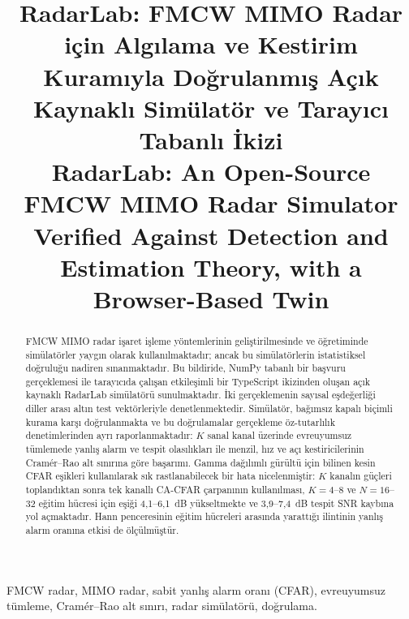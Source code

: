 \documentclass[conference,a4paper,10pt]{IEEEtran}
\begin{document}
\title{RadarLab: FMCW MIMO Radar için Algılama ve Kestirim Kuramıyla Doğrulanmış Açık Kaynaklı Simülatör ve Tarayıcı Tabanlı İkizi\\[0.6ex]
{\fontsize{13}{15.5}\selectfont RadarLab: An Open-Source FMCW MIMO Radar Simulator Verified Against Detection and Estimation Theory, with a Browser-Based Twin}}

\author{}

\maketitle

\renewcommand{\abstractname}{Özetçe}
\begin{abstract}
FMCW MIMO radar işaret işleme yöntemlerinin geliştirilmesinde ve öğretiminde simülatörler yaygın olarak kullanılmaktadır; ancak bu simülatörlerin istatistiksel doğruluğu nadiren sınanmaktadır. Bu bildiride, NumPy tabanlı bir başvuru gerçeklemesi ile tarayıcıda çalışan etkileşimli bir TypeScript ikizinden oluşan açık kaynaklı RadarLab simülatörü sunulmaktadır. İki gerçeklemenin sayısal eşdeğerliği diller arası altın test vektörleriyle denetlenmektedir. Simülatör, bağımsız kapalı biçimli kurama karşı doğrulanmakta ve bu doğrulamalar gerçekleme öz-tutarlılık denetimlerinden ayrı raporlanmaktadır: $K$ sanal kanal üzerinde evreuyumsuz tümlemede yanlış alarm ve tespit olasılıkları ile menzil, hız ve açı kestiricilerinin Cramér--Rao alt sınırına göre başarımı. Gamma dağılımlı gürültü için bilinen kesin CFAR eşikleri kullanılarak sık rastlanabilecek bir hata nicelenmiştir: $K$ kanalın güçleri toplandıktan sonra tek kanallı CA-CFAR çarpanının kullanılması, $K=4$--$8$ ve $N=16$--$32$ eğitim hücresi için eşiği 4,1--6,1~dB yükseltmekte ve 3,9--7,4~dB tespit SNR kaybına yol açmaktadır. Hann penceresinin eğitim hücreleri arasında yarattığı ilintinin yanlış alarm oranına etkisi de ölçülmüştür.
\end{abstract}
\renewcommand{\IEEEkeywordsname}{Anahtar Kelimeler}
\begin{IEEEkeywords}
FMCW radar, MIMO radar, sabit yanlış alarm oranı (CFAR), evreuyumsuz tümleme, Cramér--Rao alt sınırı, radar simülatörü, doğrulama.
\end{IEEEkeywords}
\end{document}
